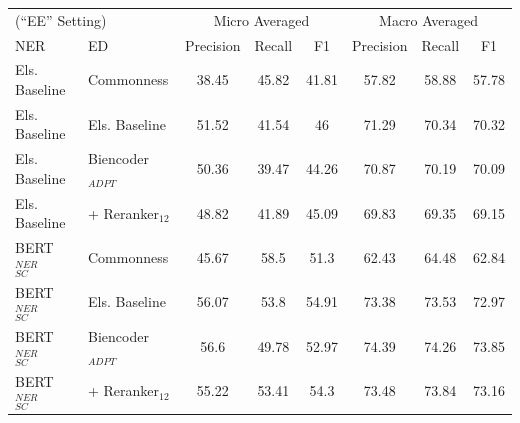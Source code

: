\documentclass{report}
\theoremstyle{definition}
\theoremstyle{remark}
\begin{document}
\begin{table}[H]
    \vspace{0.5cm}\begin{tabular}{l l c c c| c c c}
    \multicolumn{2}{l}{(``EE'' Setting)}&\multicolumn{3}{c|}{Micro Averaged}&\multicolumn{3}{c}{Macro Averaged} \\
    NER & ED &Precision&Recall&F1&Precision&Recall&F1\\
    \hline
    Els. Baseline & Commonness & 38.45&	45.82&41.81&	57.82&58.88&	57.78\\
    Els. Baseline & Els. Baseline &51.52&	41.54&46	 & 71.29&70.34  & 70.32 \\
    Els. Baseline & Biencoder$_{ADPT}$ &50.36&	39.47&44.26&	70.87&70.19&	70.09\\
    Els. Baseline  & + Reranker$_{12}$ &48.82&41.89&45.09&69.83&69.35&69.15\\
    BERT$_{SC}^{NER}$ & Commonness & 45.67&	58.5&51.3&	62.43&64.48&	62.84\\
    BERT$_{SC}^{NER}$ & Els. Baseline &56.07&	53.8&54.91&	73.38&73.53&	72.97 \\
    BERT$_{SC}^{NER}$ & Biencoder$_{ADPT}$ &56.6&	49.78&52.97&	74.39&74.26&	73.85\\
    BERT$_{SC}^{NER}$ & + Reranker$_{12}$ & 55.22&53.41&54.3&73.48&73.84&73.16\\
    \end{tabular}
    

\end{table}
\end{document}
